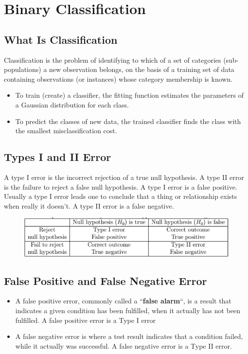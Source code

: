 \documentclass[]{report}
\begin{document}
\section*{Binary Classification}
\subsection*{What Is Classification}
Classification is the problem of identifying to which of a set of categories
(sub-populations) a new observation belongs, on the basis of a training set
of data containing observations (or instances) whose category membership is
known. 

\begin{itemize}
	\item  To train (create) a classifier, the fitting function estimates the parameters
	of a Gaussian distribution for each class.
	\item  To predict the classes of new data, the trained classifier finds the class
	with the smallest misclassification cost.
\end{itemize}
\subsection*{Types I and II Error}
A type I error is the incorrect rejection of a true null hypothesis. A type
II error is the failure to reject a false null hypothesis. A type I error is a
false positive. Usually a type I error leads one to conclude that a thing or
relationship exists when really it doesn’t. A type II error is a false negative.
\begin{figure}[h!]
	\centering
	\includegraphics[width=0.7\linewidth]{Table}
\end{figure}

\subsection*{False Positive and False Negative Error}

\begin{itemize}
	\item 
	A false positive error, commonly called a ``\textbf{false alarm}``, is a result that indicates
	a given condition has been fulfilled, when it actually has not been
	fulfilled. A false positive error is a Type I error %
	\item  A false negative error is where a test result indicates that a condition
	failed, while it actually was successful. A false negative error is a Type II
	error.%
\end{itemize}
\end{document}
